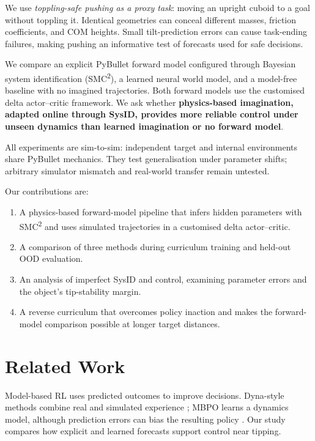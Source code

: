 \documentclass[12pt]{article}
\begin{document}
We use \emph{toppling-safe pushing as a proxy task}: moving an upright cuboid to a goal without toppling it. Identical geometries can conceal different masses, friction coefficients, and COM heights. Small tilt-prediction errors can cause task-ending failures, making pushing an informative test of forecasts used for safe decisions.

We compare an explicit PyBullet forward model configured through Bayesian system identification (SMC\textsuperscript{2}), a learned neural world model, and a model-free baseline with no imagined trajectories. Both forward models use the customised delta actor--critic framework. We ask whether \textbf{physics-based imagination, adapted online through SysID, provides more reliable control under unseen dynamics than learned imagination or no forward model}.

All experiments are sim-to-sim: independent target and internal environments share PyBullet mechanics. They test generalisation under parameter shifts; arbitrary simulator mismatch and real-world transfer remain untested.

Our contributions are:
\begin{enumerate}[leftmargin=1.6em,itemsep=1pt,topsep=2pt,beginpenalty=10000]
\item A physics-based forward-model pipeline that infers hidden parameters with
SMC\textsuperscript{2} and uses simulated trajectories in a customised delta actor--critic.
\item A comparison of three methods during curriculum training and held-out OOD evaluation.
\item An analysis of imperfect SysID and control, examining parameter errors and the object's tip-stability margin.
\item A reverse curriculum that overcomes policy inaction and makes the forward-model
comparison possible at longer target distances.
\end{enumerate}

\section{Related Work}\label{sec:related}
Model-based RL uses predicted outcomes to improve decisions. Dyna-style methods combine real and simulated experience \cite{sutton1990}; MBPO learns a dynamics model, although prediction errors can bias the resulting policy \cite{mbpo}. Our study compares how explicit and learned forecasts support control near tipping.
\end{document}
